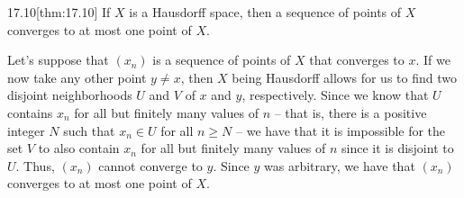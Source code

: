 \begin{thmBox}{17.10}[thm:17.10]
    If \( X \) is a Hausdorff space, then a sequence of points of \( X \) 
    converges to at most one point of \( X \).

    \baseRule

    \begin{proofBox}
        Let's suppose that \( ( x_{ n } ) \) is a sequence of points of \( X \)
        that converges to \( x \). 
        If we now take any other point \( y \neq x \), then \( X \) being 
        Hausdorff allows for us to find two disjoint neighborhoods \( U \) and
        \( V \) of \( x \) and \( y \), respectively. 
        Since we know that \( U \) contains \( x_{ n } \) for all but finitely
        many values of \( n \) -- that is, there is a positive integer \( N \) 
        such that \( x_{ n } \in U \) for all \( n \geq N \) -- we have that 
        it is impossible for the set \( V \) to also contain \( x_{ n } \) for all but finitely many values of \( n \) since it is disjoint to 
        \( U \).
        Thus, \( ( x_{ n } ) \) cannot converge to \( y \).
        Since \( y \) was arbitrary, we have that \( ( x_{ n } ) \) converges 
        to at most one point of \( X \).
    \end{proofBox}
\end{thmBox}

